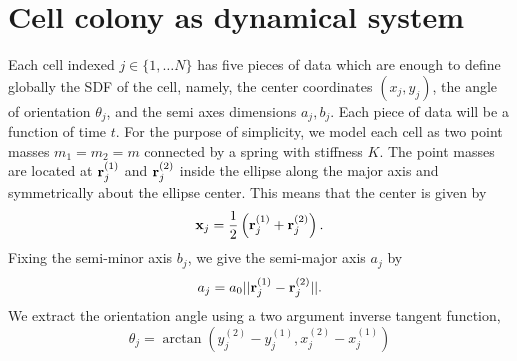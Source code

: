 \section{Cell colony as dynamical system}
Each cell indexed $j \in \{1, \ldots N\}$ has five pieces of data which are enough to define globally the 
SDF of the cell, namely, the center coordinates $(x_j,y_j)$, the angle of orientation $\theta_j$, 
and the semi axes dimensions $a_j, b_j$. Each piece of data will be a function of time $t$. For 
the purpose of simplicity, we model each cell as two point masses $m_1 = m_2 = m$ connected by a spring 
with stiffness $K$. The point masses are located at $\vb{r}_j^{(1)}$ and $\vb{r}_j^{(2)}$ inside the ellipse 
along the major axis and symmetrically about the ellipse center. This means that the center is given by 
\begin{equation*}
    \vb{x}_j = \frac{1}{2} \left(\vb{r}_j^{(1)} + \vb{r}_j^{(2)}\right).
\end{equation*}
Fixing the semi-minor axis $b_j$, we give the semi-major axis $a_j$ by 
\begin{equation*}
    a_j = a_0||\vb{r}_j^{(1)} - \vb{r}_j^{(2)}||.
\end{equation*}
We extract the orientation angle using a two argument inverse tangent function,
\begin{equation*}
    \theta_j = \arctan(y_j^{(2)} - y_j^{(1)},x_j^{(2)} - x_j^{(1)} )
\end{equation*}

